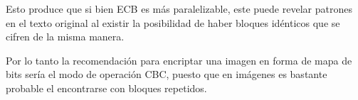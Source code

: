 \documentclass[11pt]{article}
\begin{document}
Esto produce que si bien ECB es más paralelizable, este puede revelar patrones en el texto original 
al existir la posibilidad de haber bloques idénticos que se cifren de la misma manera. 

Por lo tanto la recomendación para encriptar una imagen en forma de mapa de bits sería el modo de 
operación CBC, puesto que en imágenes es bastante probable el encontrarse con bloques repetidos.
\end{document}
